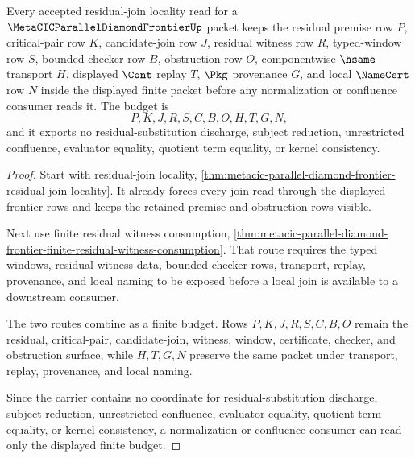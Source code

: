 \begin{theorem}
\label{thm:metacic-parallel-diamond-frontier-residual-join-locality-budget}
Every accepted residual-join locality read for a $\MetaCICParallelDiamondFrontierUp$ packet keeps the residual premise row $P$, critical-pair row $K$, candidate-join row $J$, residual witness row $R$, typed-window row $S$, bounded checker row $B$, obstruction row $O$, componentwise $\hsame$ transport $H$, displayed $\Cont$ replay $T$, $\Pkg$ provenance $G$, and local $\NameCert$ row $N$ inside the displayed finite packet before any normalization or confluence consumer reads it. The budget is
$$
P,K,J,R,S,C,B,O,H,T,G,N ,
$$
and it exports no residual-substitution discharge, subject reduction, unrestricted confluence, evaluator equality, quotient term equality, or kernel consistency.
\end{theorem}
\begin{proof}
Start with residual-join locality, \autoref{thm:metacic-parallel-diamond-frontier-residual-join-locality}. It already forces every join read through the displayed frontier rows and keeps the retained premise and obstruction rows visible.

Next use finite residual witness consumption, \autoref{thm:metacic-parallel-diamond-frontier-finite-residual-witness-consumption}. That route requires the typed windows, residual witness data, bounded checker rows, transport, replay, provenance, and local naming to be exposed before a local join is available to a downstream consumer.

The two routes combine as a finite budget. Rows $P,K,J,R,S,C,B,O$ remain the residual, critical-pair, candidate-join, witness, window, certificate, checker, and obstruction surface, while $H,T,G,N$ preserve the same packet under transport, replay, provenance, and local naming.

Since the carrier contains no coordinate for residual-substitution discharge, subject reduction, unrestricted confluence, evaluator equality, quotient term equality, or kernel consistency, a normalization or confluence consumer can read only the displayed finite budget.
\end{proof}

